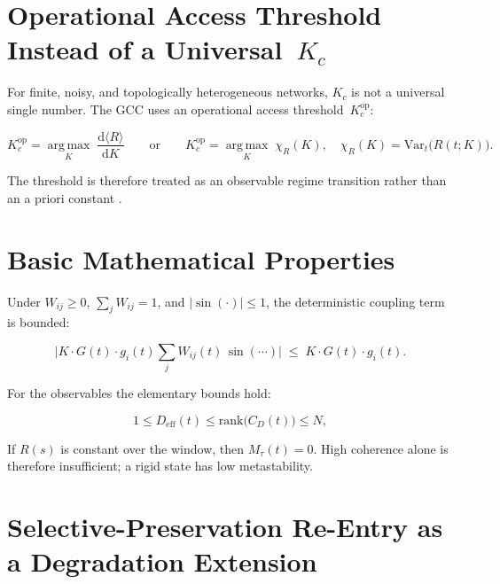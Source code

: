 \documentclass[11pt,a4paper]{article}
\theoremstyle{plain}
\theoremstyle{definition}
\theoremstyle{remark}
\newcommand{\Deff}{D_{\mathrm{eff}}}
\newcommand{\Mtau}{M_{\tau}}
\newcommand{\Kcop}{K_c^{\mathrm{op}}}
\begin{document}
\section{Operational Access Threshold Instead of a Universal~$K_c$}
\label{sec:schwelle}

For finite, noisy, and topologically heterogeneous networks, $K_c$ is not a universal single number. The GCC uses an operational access threshold~$\Kcop$:

\begin{equation}
\label{eq:Kcop}
\Kcop = \operatorname*{arg\,max}_{K}\;\frac{\mathrm{d}\langle R \rangle}{\mathrm{d}K}
\qquad\text{or}\qquad
\Kcop = \operatorname*{arg\,max}_{K}\;\chi_R(K), \quad \chi_R(K) = \mathrm{Var}_t\!\bigl(R(t;K)\bigr).
\end{equation}

The threshold is therefore treated as an observable regime transition rather than an a priori constant \citep{restrepo2005}.


\section{Basic Mathematical Properties}
\label{sec:grundsaetze}

Under $W_{ij} \geq 0$, $\sum_j W_{ij} = 1$, and $|\sin(\cdot)| \leq 1$, the deterministic coupling term is bounded:

\begin{equation}
\bigl|K \cdot G(t) \cdot g_i(t) \sum_j W_{ij}(t)\,\sin(\cdots)\bigr| \;\leq\; K \cdot G(t) \cdot g_i(t).
\end{equation}

For the observables the elementary bounds hold:

\begin{equation}
1 \leq \Deff(t) \leq \mathrm{rank}\bigl(C_D(t)\bigr) \leq N,
\end{equation}

If $R(s)$ is constant over the window, then $\Mtau(t)=0$. High coherence alone is therefore insufficient; a rigid state has low metastability.


\section{Selective-Preservation Re-Entry as a Degradation Extension}
\label{sec:TL}
\end{document}
